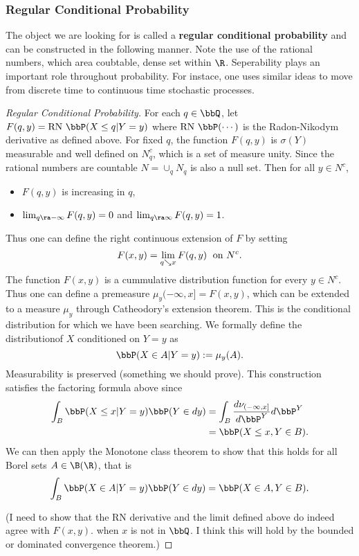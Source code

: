 \documentclass{report}
\begin{document}
\subsubsection{Regular Conditional Probability}

The object we are looking for is called a \textbf{regular conditional probability} and can be constructed in the following manner.  Note the use of the rational numbers, which area coubtable, dense set within $\R$.  Seperability plays an important role throughout probability.  For instace, one uses similar ideas to move from discrete time to continuous time stochastic processes.

\begin{proof}[Regular Conditional Probability]
For each $q \in \bbQ$, let $F(q,y) = \textmd{RN } \bbP(X \leq q | Y = y)$ where $\textmd{RN } \bbP(\cdots)$ is the Radon-Nikodym derivative as defined above.  For fixed $q$, the function $F(q,y)$ is $\sigma(Y)$ measurable and well defined on $N_q^c$, which is a set of measure unity.  Since the rational numbers are countable $N = \cup_q N_q$ is also a null set.  Then for all $y \in N^c$,
\begin{itemize}
\item $F(q,y)$ is increasing in $q$,
\item $\lim_{q \ra -\infty} F(q,y) = 0$ and $\lim_{q \ra \infty} F(q,y) = 1$.
\end{itemize}
Thus one can define the right continuous extension of $F$ by setting
\[
F(x,y) = \lim_{q \searrow x} F(q,y) \; \textmd{ on } N^c.
\]
The function $F(x,y)$ is a cummulative distribution function for every $y \in N^c$.  Thus one can define a premeasure $\mu_y(-\infty,x] = F(x,y)$, which can be extended to a measure $\mu_y$ through Catheodory's extension theorem.  This is the conditional distribution for which we have been searching.  We formally define the distributionof $X$ conditioned on $Y = y$ as
\[
\bbP(X \in A | Y = y) := \mu_y(A).
\]
Measurability is preserved (something we should prove).  This construction satisfies the factoring formula above since
\begin{align*}
\int_B \bbP(X \leq x | Y = y) \bbP(Y \in dy) 
& = \int_B \frac{d \nu_{(-\infty,x]}}{d \bbP^Y} d \bbP^{Y} \\
& = \bbP(X \leq x, Y \in B). 
\end{align*}
We can then apply the Monotone class theorem to show that this holds for all Borel sets $A \in \B(\R)$, that is
\[
\int_B \bbP(X \in A | Y = y) \bbP(Y \in dy) = \bbP(X \in A, Y \in B).
\]

(I need to show that the RN derivative and the limit defined above do indeed agree with $F(x,y)$. when $x$ is not in $\bbQ$.  I think this will hold by the bounded or dominated convergence theorem.)
\end{proof}
\end{document}

